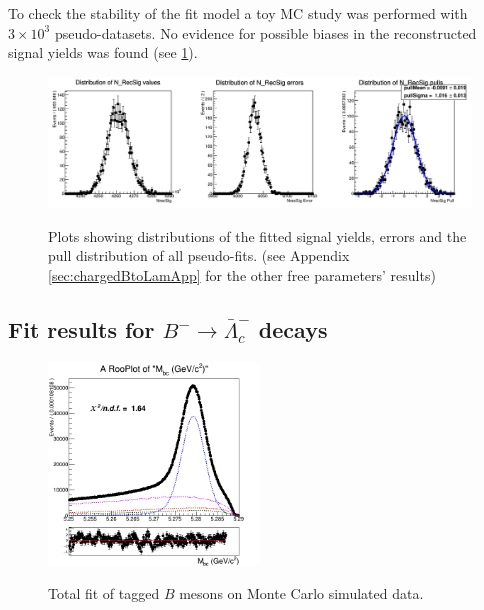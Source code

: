 To check the stability of the fit model a toy MC study was performed with  $3\times10^3$ pseudo-datasets. 
No evidence for possible biases in the reconstructed signal yields was found (see \cref{fig:NrecSignalchargedCorrBtag_mcstudy}).


\begin{figure}[H]
    \centering
    {\centering\includegraphics[width=14cm]{05-BtagFit/figs/NrecSigBtag_mcstudy.png}}
     \caption{Plots showing distributions of the fitted signal yields, errors and the pull distribution of
    all pseudo-fits. (see Appendix \ref{sec:chargedBtoLamApp} for the other free parameters' results)}
      \label{fig:NrecSignalchargedCorrBtag_mcstudy}
      \end{figure}



\subsection{Fit results for $B^- \rightarrow \bar{\Lambda}_c^-$ decays}  
\begin{figure}[H]
    \centering
    {\includegraphics[width=0.50\textwidth]{05-BtagFit/figs/NEW_chargedBtag_anticorrLambdaC_Total_fit_sigmaCB_misRecoSlope_free_370bins.png}}
    \caption{Total fit of tagged $B$ mesons on Monte Carlo simulated data.}
    \label{fig:chargedAntiLambdaC_BtagFit}
    \end{figure}
    \vspace{1.5cm} 



